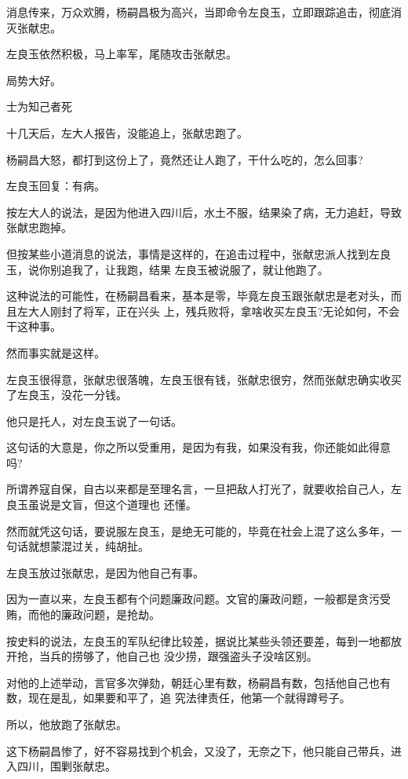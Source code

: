 \documentclass[11pt,a4paper,onecolumn]{article}
\begin{document}
消息传来，万众欢腾，杨嗣昌极为高兴，当即命令左良玉，立即跟踪追击，彻底消灭张献忠。

左良玉依然积极，马上率军，尾随攻击张献忠。

局势大好。

士为知己者死

十几天后，左大人报告，没能追上，张献忠跑了。

杨嗣昌大怒，都打到这份上了，竟然还让人跑了，干什么吃的，怎么回事?

左良玉回复：有病。

按左大人的说法，是因为他进入四川后，水土不服，结果染了病，无力追赶，导致张献忠跑掉。

但按某些小道消息的说法，事情是这样的，在追击过程中，张献忠派人找到左良玉，说你别追我了，让我跑，结果
左良玉被说服了，就让他跑了。

这种说法的可能性，在杨嗣昌看来，基本是零，毕竟左良玉跟张献忠是老对头，而且左大人刚封了将军，正在兴头
上，残兵败将，拿啥收买左良玉?无论如何，不会干这种事。

然而事实就是这样。

左良玉很得意，张献忠很落魄，左良玉很有钱，张献忠很穷，然而张献忠确实收买了左良玉，没花一分钱。

他只是托人，对左良玉说了一句话。

这句话的大意是，你之所以受重用，是因为有我，如果没有我，你还能如此得意吗?

所谓养寇自保，自古以来都是至理名言，一旦把敌人打光了，就要收拾自己人，左良玉虽说是文盲，但这个道理也
还懂。

然而就凭这句话，要说服左良玉，是绝无可能的，毕竟在社会上混了这么多年，一句话就想蒙混过关，纯胡扯。

左良玉放过张献忠，是因为他自己有事。

因为一直以来，左良玉都有个问题\myrule 廉政问题。文官的廉政问题，一般都是贪污受贿，而他的廉政问题，是抢劫。

按史料的说法，左良玉的军队纪律比较差，据说比某些头领还要差，每到一地都放开抢，当兵的捞够了，他自己也
没少捞，跟强盗头子没啥区别。

对他的上述举动，言官多次弹劾，朝廷心里有数，杨嗣昌有数，包括他自己也有数，现在是乱，如果要和平了，追
究法律责任，他第一个就得蹲号子。

所以，他放跑了张献忠。

这下杨嗣昌惨了，好不容易找到个机会，又没了，无奈之下，他只能自己带兵，进入四川，围剿张献忠。

\section[\thesection]{}
\end{document}
